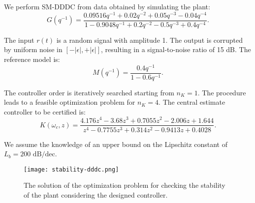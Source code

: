 \begin{example}[example]
    
We perform SM-DDDC from data obtained by simulating the plant:
\[
G(q^{-1}) = \frac{0.09516q^{-1} + 0.02q^{-2} + 0.05q^{-3} - 0.04q^{-4}}{1 - 0.9048q^{-1} + 0.2q^{-2} - 0.5q^{-3} + 0.4q^{-4}}.
\]

The input \( r(t) \) is a random signal with amplitude 1. The output is corrupted by uniform noise in \([-|\epsilon|, +|\epsilon|]\), resulting in a signal-to-noise ratio of 15 dB. The reference model is:
\[
M(q^{-1}) = \frac{0.4q^{-1}}{1 - 0.6q^{-1}}.
\]

The controller order is iteratively searched starting from \( n_K = 1 \). The procedure leads to a feasible optimization problem for \( n_K = 4 \). The central estimate controller to be certified is:
\[
K(\omega_c, z) = \frac{4.176z^4 - 3.68z^3 + 0.7055z^2 - 2.006z + 1.644}{z^4 - 0.7755z^3 + 0.314z^2 - 0.9413z + 0.4028}.
\]

We assume the knowledge of an upper bound on the Lipschitz constant of \( L_b = 200\text{ dB/dec} \).
 \begin{figure}[H]
    \centering
    \texttt{[image: stability-dddc.png]}
    \caption{The solution of the optimization problem for checking the stability of the plant considering the designed controller.}
 \end{figure}
\end{example}













